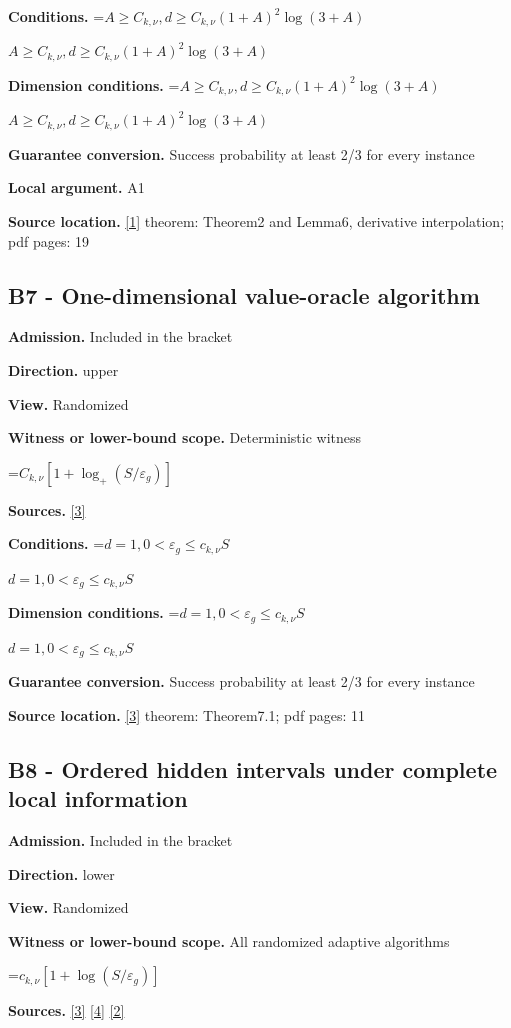 \documentclass[10pt,a4paper]{article}
\newcommand{\AtlasMath}[1]{\par\begingroup\centering\setbox0=\hbox{$\displaystyle #1$}\ifdim\wd0>1.4\linewidth\typeout{ATLAS WIDE FORMULA: \the\wd0}\fi\ifdim\wd0>\linewidth\resizebox{\linewidth}{!}{\box0}\else\box0\fi\par\endgroup}
\newcommand{\AtlasInlineMath}[1]{\begingroup\setbox0=\hbox{$#1$}\ifdim\wd0>.4\linewidth\endgroup\AtlasMath{#1}\else\endgroup$#1$\fi}
\begin{document}
\textbf{Conditions.} \AtlasInlineMath{A\ge C_{k,\nu},d\ge C_{k,\nu}(1+A)^2 \log(3+A)}

\textbf{Dimension conditions.} \AtlasInlineMath{A\ge C_{k,\nu},d\ge C_{k,\nu}(1+A)^2 \log(3+A)}

\textbf{Guarantee conversion.} Success probability at least 2/3 for every instance

\textbf{Local argument.} A1

\textbf{Source location.} \href{https://arxiv.org/abs/1710.11606}{[1]} theorem: Theorem2 and Lemma6, derivative interpolation; pdf pages: 19

\subsection{B7 - One-dimensional value-oracle algorithm}
\textbf{Admission.} Included in the bracket

\textbf{Direction.} upper

\textbf{View.} Randomized

\textbf{Witness or lower-bound scope.} Deterministic witness

\AtlasMath{C_{k,\nu}[1+\log_+(S/\varepsilon_g)]}
\textbf{Sources.} \href{https://arxiv.org/abs/2610.16295}{[3]}

\textbf{Conditions.} \AtlasInlineMath{d=1,0<\varepsilon_g\le c_{k,\nu}S}

\textbf{Dimension conditions.} \AtlasInlineMath{d=1,0<\varepsilon_g\le c_{k,\nu}S}

\textbf{Guarantee conversion.} Success probability at least 2/3 for every instance

\textbf{Source location.} \href{https://arxiv.org/abs/2610.16295}{[3]} theorem: Theorem7.1; pdf pages: 11

\subsection{B8 - Ordered hidden intervals under complete local information}
\textbf{Admission.} Included in the bracket

\textbf{Direction.} lower

\textbf{View.} Randomized

\textbf{Witness or lower-bound scope.} All randomized adaptive algorithms

\AtlasMath{c_{k,\nu}[1+\log(S/\varepsilon_g)]}
\textbf{Sources.} \href{https://arxiv.org/abs/2610.16295}{[3]} \href{https://arxiv.org/abs/1710.11606v3}{[4]} \href{https://arxiv.org/abs/1811.01220}{[2]}
\end{document}
